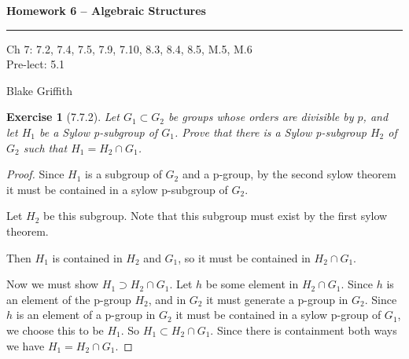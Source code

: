\documentclass[12pt]{article}
\newtheorem*{exer}{Exercise}
\begin{document}
\textbf{Homework 6 -- Algebraic Structures} \\

\hrule

\begin{minipage}{.80\linewidth}
    \flushleft
    Ch 7: 7.2, 7.4, 7.5, 7.9, 7.10, 8.3, 8.4, 8.5, M.5, M.6 \\ 
    Pre-lect: 5.1 \\
\end{minipage}
\begin{minipage}{.20\linewidth}
    \flushright
    Blake Griffith
\end{minipage}


\begin{exer}[7.7.2]

    Let $G_1 \subset G_2$ be groups whose orders are divisible by $p$,
    and let $H_1$ be a Sylow p-subgroup of $G_1$. Prove that there is a
    Sylow p-subgroup $H_2$ of $G_2$ such that $H_1 = H_2 \cap G_1$.

\end{exer}

\begin{proof}

    Since $H_1$ is a subgroup of $G_2$ and a p-group, by the second
    sylow theorem it must be contained in a sylow p-subgroup of $G_2$.

    Let $H_2$ be this subgroup. Note that this subgroup must exist by
    the first sylow theorem.

    Then $H_1$ is contained in $H_2$ and $G_1$, so it must be contained
    in $H_2 \cap G_1$. 

    Now we must show $H_1 \supset H_2 \cap G_1$. Let $h$ be some element
    in $H_2 \cap G_1$. Since $h$ is an element of the p-group $H_2$, and
    in $G_2$ it must generate a p-group in $G_{2}$. Since $h$ is an
    element of a p-group in $G_2$ it must be contained in a sylow
    p-group of $G_1$, we choose this to be $H_1$. So $H_1 \subset H_2
    \cap G_1$. Since there is containment both ways we have $H_1 = H_2
    \cap G_1$. 

\end{proof}

\end{document}
